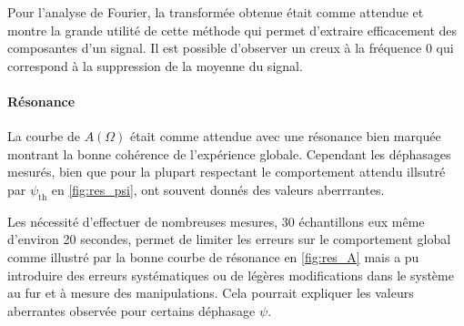 Pour l'analyse de Fourier, la transformée obtenue était comme attendue et montre la grande utilité de cette méthode qui permet d'extraire efficacement des composantes d'un signal. Il est possible d'observer un creux à la fréquence 0 qui correspond à la suppression de la moyenne du signal.

\paragraph{Résonance}
La courbe de $A(\Omega)$ était comme attendue avec une résonance bien marquée montrant la bonne cohérence de l'expérience globale. Cependant les déphasages mesurés, bien que pour la plupart respectant le comportement attendu illsutré par $\psi_\mathrm{th}$ en \autoref{fig:res_psi}, ont souvent donnés des valeurs aberrrantes.

Les nécessité d'effectuer de nombreuses mesures, 30 échantillons eux même d'environ 20 secondes, permet de limiter les erreurs sur le comportement global comme illustré par la bonne courbe de résonance en \autoref{fig:res_A} mais a pu introduire des erreurs systématiques ou de légères modifications dans le système au fur et à mesure des manipulations. Cela pourrait expliquer les valeurs aberrantes observée pour certains déphasage $\psi$.

